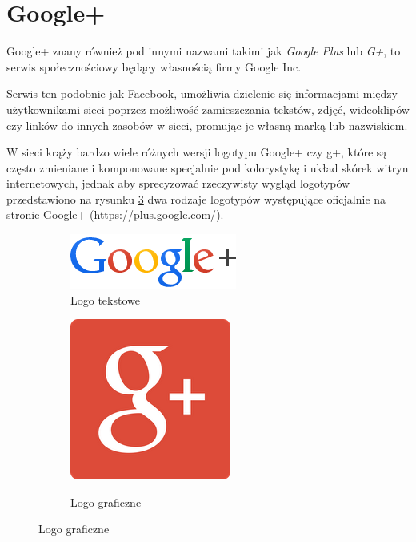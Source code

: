 \section{Google+}
\label{sec:google-plus}
Google+ znany również pod innymi nazwami takimi jak \emph{Google Plus} lub \emph{G+}, to serwis społecznościowy będący własnością firmy Google Inc.

Serwis ten podobnie jak Facebook, umożliwia dzielenie się informacjami między użytkownikami sieci poprzez możliwość zamieszczania tekstów, zdjęć, wideoklipów czy linków do innych zasobów w sieci, promując je własną marką lub nazwiskiem.

W sieci krąży bardzo wiele różnych wersji logotypu Google+ czy g+, które są często zmieniane i komponowane specjalnie pod kolorystykę i układ skórek witryn internetowych, jednak aby sprecyzować rzeczywisty wygląd logotypów przedstawiono na rysunku \ref{fig:logo-google} dwa rodzaje logotypów występujące oficjalnie na stronie Google+ (\url{https://plus.google.com/}).

\begin{figure}[!h]
\centering
\begin{subfigure}{.5\textwidth}
  \centering
  \includegraphics[width=.4\linewidth]{images/googleplus_color.png}
  \caption{Logo tekstowe}
  \label{fig:sub1}
\end{subfigure}%
\begin{subfigure}{.5\textwidth}
  \centering
  \scalebox{0.7}
  {
      \includegraphics[width=.4\linewidth]{images/google-plus-logo.png}
  }  
  \caption{Logo graficzne}
  \label{fig:sub2}
\end{subfigure}
\label{fig:logo-google}
\end{figure}


